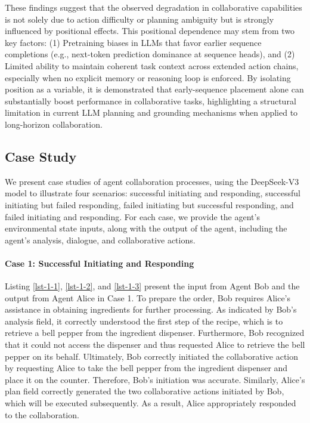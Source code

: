 \documentclass[11pt]{article}
\begin{document}
These findings suggest that the observed degradation in collaborative capabilities is not solely due to action difficulty or planning ambiguity but is strongly influenced by positional effects. This positional dependence may stem from two key factors: (1) Pretraining biases in LLMs that favor earlier sequence completions (e.g., next-token prediction dominance at sequence heads), and (2) Limited ability to maintain coherent task context across extended action chains, especially when no explicit memory or reasoning loop is enforced. By isolating position as a variable, it is demonstrated that early-sequence placement alone can substantially boost performance in collaborative tasks, highlighting a structural limitation in current LLM planning and grounding mechanisms when applied to long-horizon collaboration.





\subsection{Case Study}

We present case studies of agent collaboration processes, using the DeepSeek-V3 model to illustrate four scenarios: successful initiating and responding, successful initiating but failed responding, failed initiating but successful responding, and failed initiating and responding. For each case, we provide the agent’s environmental state inputs, along with the output of the agent, including the agent's analysis, dialogue, and collaborative actions.

\paragraph{Case 1: Successful Initiating and Responding}
Listing \ref{lst-1-1}, \ref{lst-1-2}, and \ref{lst-1-3} present the input from Agent Bob and the output from Agent Alice in Case 1. To prepare the order, Bob requires Alice's assistance in obtaining ingredients for further processing. As indicated by Bob's analysis field, it correctly understood the first step of the recipe, which is to retrieve a bell pepper from the ingredient dispenser. Furthermore, Bob recognized that it could not access the dispenser and thus requested Alice to retrieve the bell pepper on its behalf. Ultimately, Bob correctly initiated the collaborative action by requesting Alice to take the bell pepper from the ingredient dispenser and place it on the counter. Therefore, Bob's initiation was accurate. Similarly, Alice's plan field correctly generated the two collaborative actions initiated by Bob, which will be executed subsequently. As a result, Alice appropriately responded to the collaboration.
\end{document}
